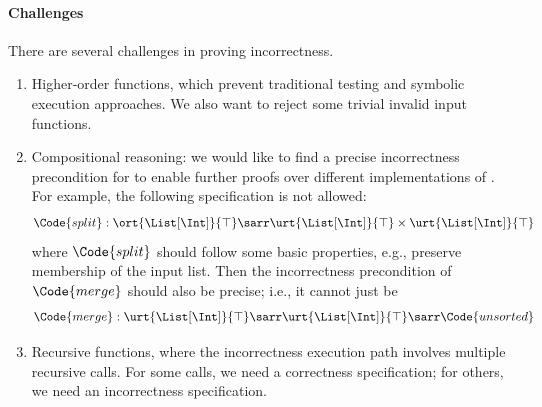 \paragraph{Challenges} There are several challenges in proving incorrectness.
\begin{enumerate}
    \item Higher-order functions, which prevent traditional testing and symbolic execution approaches. We also want to reject some trivial invalid input functions.
    \item Compositional reasoning: we would like to find a precise incorrectness precondition for  to enable further proofs over different implementations of . For example, the following specification is not allowed:
    \begin{align*}
        \Code{split} : \ort{\List[\Int]}{\top} \sarr \urt{\List[\Int]}{\top} \times \urt{\List[\Int]}{\top}
    \end{align*}\noindent
    where $\Code{split}$ should follow some basic properties, e.g., preserve membership of the input list.
    Then the incorrectness precondition of $\Code{merge}$ should also be precise; i.e., it cannot just be 
    \begin{align*}
        \Code{merge} : \urt{\List[\Int]}{\top} \sarr \urt{\List[\Int]}{\top} \sarr \Code{unsorted}
    \end{align*}\noindent
    \item Recursive functions, where the incorrectness execution path involves multiple recursive calls. For some calls, we need a correctness specification; for others, we need an incorrectness specification.
\end{enumerate}

